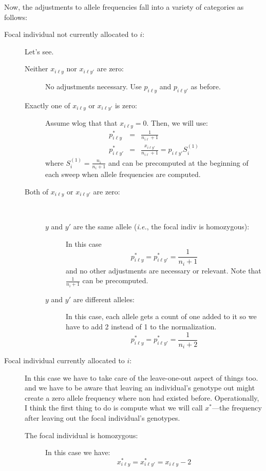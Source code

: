 \documentclass[11pt]{article}
\newcommand{\ie}{{\em i.e.},\xspace }
\begin{document}
Now, the adjustments to allele frequencies fall into a variety of categories as follows:
\begin{description}
	\item[Focal individual not currently allocated to $i$:] Let's see. 
	\begin{description}
		\item [Neither $x_{i\ell y}$ nor $x_{i\ell y'}$ are zero:] No adjustments necessary.  Use $p_{i\ell y}$ and $p_{i\ell y'}$ as before.
		\item [Exactly one of $x_{i\ell y}$ or $x_{i\ell y'}$ is zero:] Assume wlog that that $x_{i\ell y} = 0$.  Then, we will use:
		\begin{eqnarray*}
			p^*_{i\ell y} & = & \frac{1}{n_{i\ell} + 1} \\
			p^*_{i\ell y'} & = & \frac{x_{i\ell y'}}{n_{i\ell} + 1} = p_{i\ell y'} S_i^{(1)}
		\end{eqnarray*}
		where $S_i^{(1)} = \frac{n_i}{n_i + 1}$ and can be precomputed at the beginning of each sweep when allele frequencies are computed.
		\item [Both of $x_{i\ell y}$ or $x_{i\ell y'}$ are zero:] ~
		\begin{description}
			\item [$y$ and $y'$ are the same allele (\ie the focal indiv is homozygous):] In this case
			\[
				p^*_{i\ell y} = p^*_{i\ell y'} = \frac{1}{n_i + 1}
			\]
			and no other adjustments are necessary or relevant.  Note that $\frac{1}{n_i + 1}$ can be precomputed.
			\item [$y$ and $y'$ are different alleles:] In this case, each allele gets a count of one added to it
			so we have to add 2 instead of 1 to the normalization.
			\[
				p^*_{i\ell y} = p^*_{i\ell y'} = \frac{1}{n_i + 2}
			\]
		\end{description}
	\end{description}
	\item [Focal individual currently allocated to $i$:] In this case we have to take care of the leave-one-out aspect of things too.
	and we have to be aware that leaving an individual's genotype out might create a zero allele frequency where non had existed before.  
	Operationally, I think the first thing to do is compute what we will call $x^*$---the frequency after leaving out the focal
	individual's genotypes. 
	\begin{description}
		\item [The focal individual is homozygous:] In this case we have:
		\[
			x^*_{i\ell y} = x^*_{i\ell y'} = x_{i\ell y} - 2
\]
\end{description}
\end{description}
\end{document}
